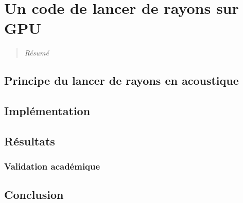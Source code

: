 \chapter{Un code de lancer de rayons sur GPU}
\label{chap:ch4}
\begin{quotation}
\textit{Résumé}
\end{quotation}
\minitoc
\newpage
 
  
\section{Principe du lancer de rayons en acoustique}
\section{Implémentation}
\section{Résultats}
\subsection{Validation académique}
\section{Conclusion}

